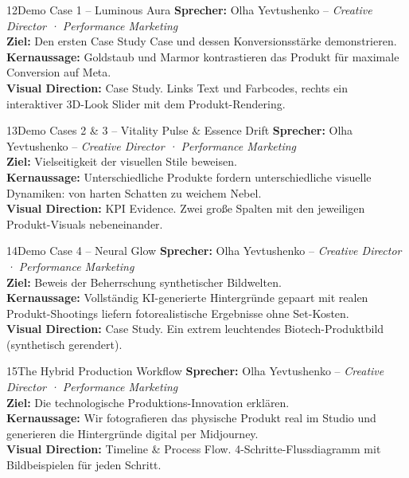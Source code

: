 \documentclass[11pt,a4paper]{article}
\begin{document}
\begin{slidebox}{12}{Demo Case 1 -- Luminous Aura}
    \textbf{Sprecher:} Olha Yevtushenko -- \textit{Creative Director · Performance Marketing} \\
    \textbf{Ziel:} Den ersten Case Study Case und dessen Konversionsstärke demonstrieren.\\
    \textbf{Kernaussage:} Goldstaub und Marmor kontrastieren das Produkt für maximale Conversion auf Meta.\\
    \textbf{Visual Direction:} Case Study. Links Text und Farbcodes, rechts ein interaktiver 3D-Look Slider mit dem Produkt-Rendering.
\end{slidebox}

\begin{slidebox}{13}{Demo Cases 2 \& 3 -- Vitality Pulse \& Essence Drift}
    \textbf{Sprecher:} Olha Yevtushenko -- \textit{Creative Director · Performance Marketing} \\
    \textbf{Ziel:} Vielseitigkeit der visuellen Stile beweisen.\\
    \textbf{Kernaussage:} Unterschiedliche Produkte fordern unterschiedliche visuelle Dynamiken: von harten Schatten zu weichem Nebel.\\
    \textbf{Visual Direction:} KPI Evidence. Zwei große Spalten mit den jeweiligen Produkt-Visuals nebeneinander.
\end{slidebox}

\begin{slidebox}{14}{Demo Case 4 -- Neural Glow}
    \textbf{Sprecher:} Olha Yevtushenko -- \textit{Creative Director · Performance Marketing} \\
    \textbf{Ziel:} Beweis der Beherrschung synthetischer Bildwelten.\\
    \textbf{Kernaussage:} Vollständig KI-generierte Hintergründe gepaart mit realen Produkt-Shootings liefern fotorealistische Ergebnisse ohne Set-Kosten.\\
    \textbf{Visual Direction:} Case Study. Ein extrem leuchtendes Biotech-Produktbild (synthetisch gerendert).
\end{slidebox}

\begin{slidebox}{15}{The Hybrid Production Workflow}
    \textbf{Sprecher:} Olha Yevtushenko -- \textit{Creative Director · Performance Marketing} \\
    \textbf{Ziel:} Die technologische Produktions-Innovation erklären.\\
    \textbf{Kernaussage:} Wir fotografieren das physische Produkt real im Studio und generieren die Hintergründe digital per Midjourney.\\
    \textbf{Visual Direction:} Timeline \& Process Flow. 4-Schritte-Flussdiagramm mit Bildbeispielen für jeden Schritt.
\end{slidebox}
\end{document}
